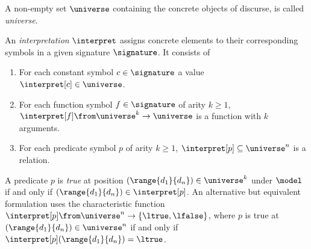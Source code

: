             \begin{definition}[Universe]
                A non-empty set $\universe$ containing the concrete objects of discurse, is called \emph{universe}.
            \end{definition}

            \begin{definition}[Interpretation]
                An \emph{interpretation} $\interpret$ assigns concrete elements to their corresponding symbols in a given signature $\signature$. It consists of
                \begin{enumerate}
                    \item For each constant symbol $c\in\signature$ a value $\interpret[c]\in\universe$.
                    \item For each function symbol $f\in\signature$ of arity $k\geq 1$, $\interpret[f]\from\universe^k\to\universe$ is a function with $k$ arguments.
                    \item For each predicate symbol $p$ of arity $k\geq 1$, $\interpret[p]\subseteq\universe^n$ is a relation.
                \end{enumerate}
            \end{definition}


            A predicate $p$ is \emph{true} at position $(\range{d_1}{d_n})\in\universe^k$ under $\model$ if and only if $(\range{d_1}{d_n})\in\interpret[p]$.
            An alternative but equivalent formulation uses the characteristic function $\interpret[p]\from\universe^n\to\{\ltrue,\lfalse\}$, where $p$ is true at $(\range{d_1}{d_n})\in\universe^n$ if and only if $\interpret[p](\range{d_1}{d_n})=\ltrue$.




